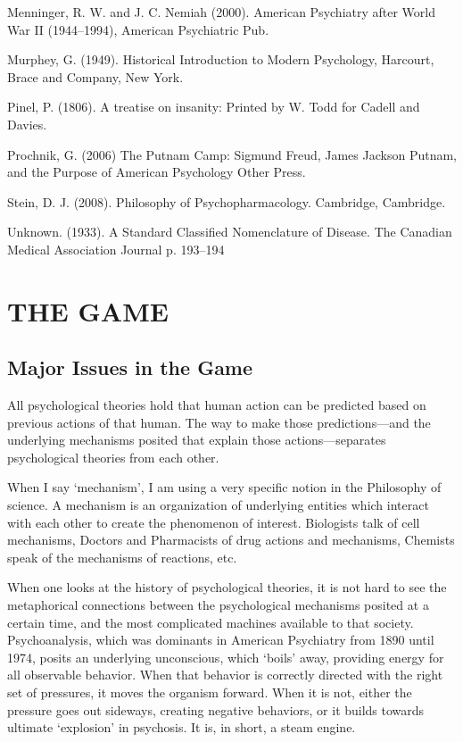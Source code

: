 Menninger, R. W. and J. C. Nemiah (2000). American Psychiatry after World War II (1944--1994), American Psychiatric Pub.

Murphey, G. (1949). Historical Introduction to Modern Psychology, Harcourt, Brace and Company, New York.

Pinel, P. (1806). A treatise on insanity: Printed by W. Todd for Cadell and Davies.

Prochnik, G. (2006) The Putnam Camp: Sigmund Freud, James Jackson Putnam, and the Purpose of American Psychology Other Press.

Stein, D. J. (2008). Philosophy of Psychopharmacology. Cambridge, Cambridge.

Unknown. (1933). A Standard Classified Nomenclature of Disease. The Canadian Medical Association Journal p. 193--194

\pagebreak 

\chapter{THE GAME}
\label{thegame}

\section{Major Issues in the Game}
\label{majorissuesinthegame}

All psychological theories hold that human action can be predicted based on previous actions of that human. The way to make those predictions---and the underlying mechanisms posited that explain those actions---separates psychological theories from each other.

When I say ‘mechanism’, I am using a very specific notion in the Philosophy of science. A mechanism is an organization of underlying entities which interact with each other to create the phenomenon of interest. Biologists talk of cell mechanisms, Doctors and Pharmacists of drug actions and mechanisms, Chemists speak of the mechanisms of reactions, etc. 

When one looks at the history of psychological theories, it is not hard to see the metaphorical connections between the psychological mechanisms posited at a certain time, and the most complicated machines available to that society. Psychoanalysis, which was dominants in American Psychiatry from 1890 until 1974, posits an underlying unconscious, which ‘boils’ away, providing energy for all observable behavior. When that behavior is correctly directed with the right set of pressures, it moves the organism forward. When it is not, either the pressure goes out sideways, creating negative behaviors, or it builds towards ultimate ‘explosion’ in psychosis. It is, in short, a steam engine.

